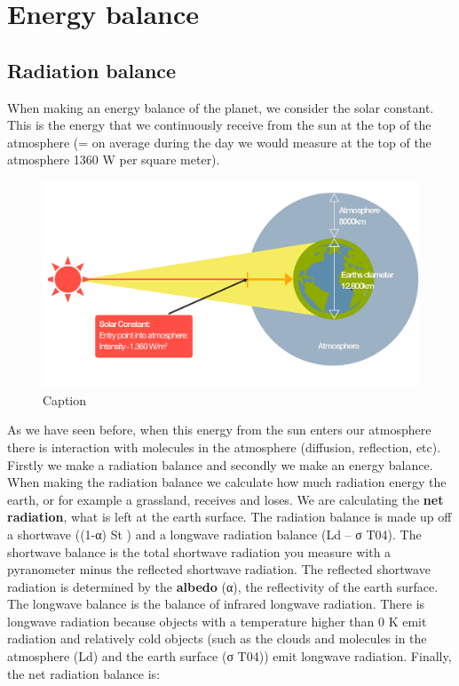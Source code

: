\documentclass[oneside]{book}
\begin{document}
\section{Energy balance}\label{energy-balance}

\subsection{Radiation balance}\label{radiation-balance}

When making an energy balance of the planet, we consider the solar
constant. This is the energy that we continuously receive from the sun
at the top of the atmosphere (= on average during the day we would
measure at the top of the atmosphere 1360 W per square meter).

\begin{figure}

{\centering \includegraphics[width=0.5\linewidth]{figures/Figure133} 

}

\caption{Caption}\label{fig:RadBalance}
\end{figure}

As we have seen before, when this energy from the sun enters our
atmosphere there is interaction with molecules in the atmosphere
(diffusion, reflection, etc). Firstly we make a radiation balance and
secondly we make an energy balance. When making the radiation balance we
calculate how much radiation energy the earth, or for example a
grassland, receives and loses. We are calculating the \textbf{net
radiation}, what is left at the earth surface. The radiation balance is
made up off a shortwave ((1-α) St ) and a longwave radiation balance (Ld
-- σ T04). The shortwave balance is the total shortwave radiation you
measure with a pyranometer minus the reflected shortwave radiation. The
reflected shortwave radiation is determined by the \textbf{albedo} (α),
the reflectivity of the earth surface. The longwave balance is the
balance of infrared longwave radiation. There is longwave radiation
because objects with a temperature higher than 0 K emit radiation and
relatively cold objects (such as the clouds and molecules in the
atmosphere (Ld) and the earth surface (σ T04)) emit longwave radiation.
Finally, the net radiation balance is:
\end{document}
